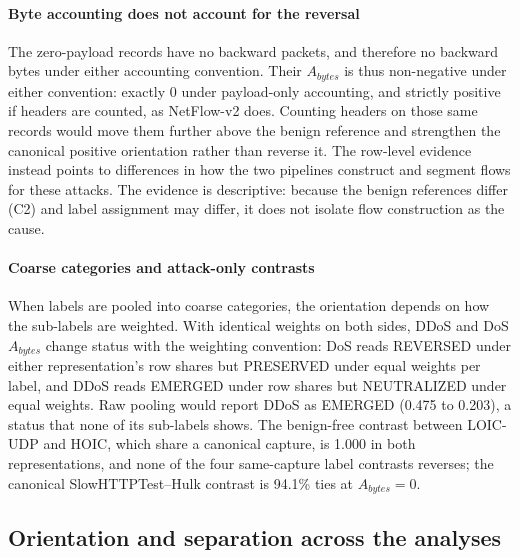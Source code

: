 \documentclass[preprint,12pt]{elsarticle}
\begin{document}
\paragraph{Byte accounting does not account for the reversal} The zero-payload records have no backward packets, and therefore no backward bytes under either accounting convention. Their $A_{bytes}$ is thus non-negative under either convention: exactly 0 under payload-only accounting, and strictly positive if headers are counted, as NetFlow-v2 does. Counting headers on those same records would move them further above the benign reference and strengthen the canonical positive orientation rather than reverse it. The row-level evidence instead points to differences in how the two pipelines construct and segment flows for these attacks. The evidence is descriptive: because the benign references differ (C2) and label assignment may differ, it does not isolate flow construction as the cause.

\paragraph{Coarse categories and attack-only contrasts} When labels are pooled into coarse categories, the orientation depends on how the sub-labels are weighted. With identical weights on both sides, DDoS and DoS $A_{bytes}$ change status with the weighting convention: DoS reads REVERSED under either representation's row shares but PRESERVED under equal weights per label, and DDoS reads EMERGED under row shares but NEUTRALIZED under equal weights. Raw pooling would report DDoS as EMERGED (0.475 to 0.203), a status that none of its sub-labels shows. The benign-free contrast between LOIC-UDP and HOIC, which share a canonical capture, is 1.000 in both representations, and none of the four same-capture label contrasts reverses; the canonical SlowHTTPTest--Hulk contrast is 94.1\% ties at $A_{bytes}=0$.

\subsection{Orientation and separation across the analyses}\label{sec:orientsep}
\end{document}
